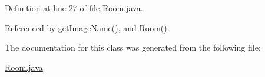 Definition at line \hyperlink{Room_8java_source_l00027}{27} of file \hyperlink{Room_8java_source}{Room.\-java}.



Referenced by \hyperlink{Room_8java_source_l00155}{get\-Image\-Name()}, and \hyperlink{Room_8java_source_l00049}{Room()}.



The documentation for this class was generated from the following file\-:\begin{DoxyCompactItemize}
\item 
\hyperlink{Room_8java}{Room.\-java}\end{DoxyCompactItemize}
